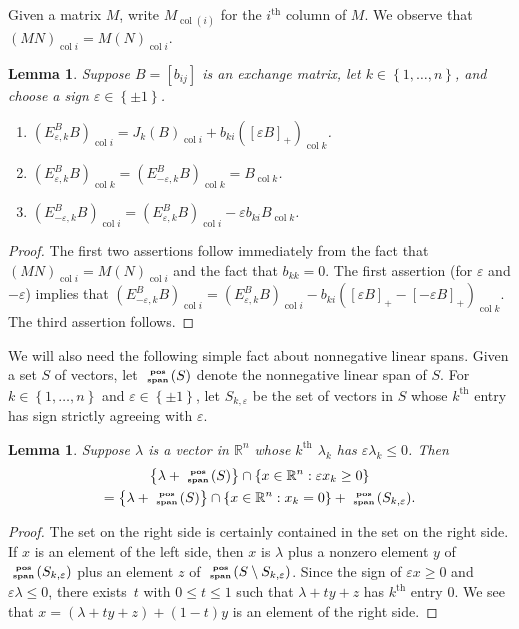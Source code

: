 \documentclass{amsart}
\newtheorem{lemma}[proposition]{Lemma}
\theoremstyle{definition}
\theoremstyle{remark}
\numberwithin{equation}{section}
\newcommand{\reals}{\mathbb R}
\newcommand{\ep}{\varepsilon}
\newcommand{\col}{\operatorname{col}}
\newcommand{\sgn}{\operatorname{sgn}}
\newcommand{\posspan}{\!\tiny\begin{array}{c}\mathbf{pos}\\\mathbf{span}\end{array}\!\!}
\newcommand{\set}[1]{{\left\lbrace #1 \right\rbrace}}
\renewcommand{\th}{^\text{th}}
\newcommand{\0}{{\mathbf{0}}}
\renewcommand{\th}{^\text{th}}
\begin{document}
Given a matrix $M$, write $M_{\col(i)}$ for the $i\th$ column of $M$.
We observe that $(MN)_{\col i}=M(N)_{\col i}$.
\begin{lemma}\label{columns lem}
Suppose $B=[b_{ij}]$ is an exchange matrix, let $k\in\set{1,\ldots,n}$, and choose a sign $\ep\in\set{\pm1}$.
\begin{enumerate}[\quad\bf1.]
\item \label{col i}
$(E_{\ep,k}^BB)_{\col i}=J_k(B)_{\col i}+b_{ki}([\ep B]_+)_{\col k}$.
\item \label{col k}
$(E_{\ep,k}^BB)_{\col k}=(E_{-\ep,k}^BB)_{\col k}=B_{\col k}$.
\item \label{cols k}
$(E_{-\ep,k}^BB)_{\col i}=(E_{\ep,k}^BB)_{\col i}-\ep b_{ki}B_{\col k}$.
\end{enumerate}
\end{lemma}
\begin{proof}
The first two assertions follow immediately from the fact that $(MN)_{\col i}=M(N)_{\col i}$ and the fact that $b_{kk}=0$.
The first assertion (for $\ep$ and $-\ep$) implies that $(E_{-\ep,k}^BB)_{\col i}=(E_{\ep,k}^BB)_{\col i}-b_{ki}([\ep B]_+-[-\ep B]_+)_{\col k}$.  
The third assertion follows.
\end{proof}

We will also need the following simple fact about nonnegative linear spans.
Given a set $S$ of vectors, let $\posspan(S)$ denote the nonnegative linear span of $S$.
For $k\in\set{1,\ldots,n}$ and $\ep\in\set{\pm1}$, let $S_{k,\ep}$ be the set of vectors in $S$ whose $k\th$ entry has sign strictly agreeing with $\ep$.

\begin{lemma}\label{ps lemma}
Suppose $\lambda$ is a vector in $\reals^n$ whose $k\th$ $\lambda_k$ has $\ep\lambda_k\le0$.
Then %
\begin{multline*}
\set{\lambda+\posspan(S)}\cap\set{x\in\reals^n:\ep x_k\ge0}\\
=\set{\lambda+\posspan(S)}\cap\set{x\in\reals^n:x_k=0}+\posspan(S_{k,\ep}).
\end{multline*}
\end{lemma}
\begin{proof}
The set on the right side is certainly contained in the set on the right side.
If $x$ is an element of the left side, then $x$ is $\lambda$ plus a nonzero element $y$ of $\posspan(S_{k,\ep})$ plus an element $z$ of $\posspan(S\setminus S_{k,\ep})$.
Since the sign of $\ep x\ge0$ and $\ep\lambda\le0$, there exists~$t$ with $0\le t\le1$ such that $\lambda+ty+z$ has $k\th$ entry $0$.
We see that ${x=(\lambda+ty+z)+(1-t)y}$ is an element of the right side.
\end{proof}
\end{document}
